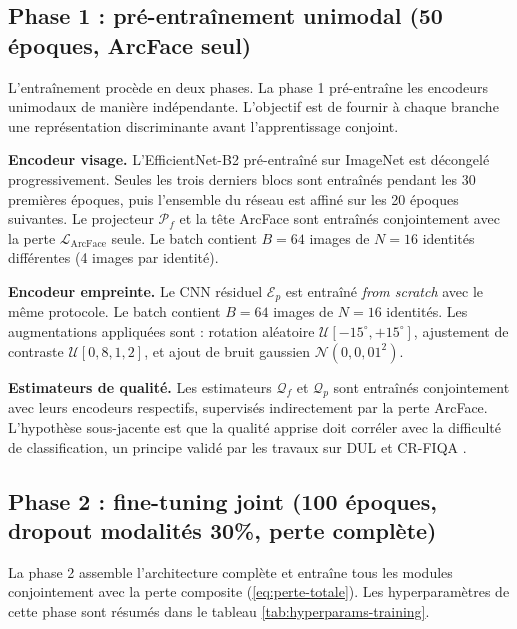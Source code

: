 \documentclass[12pt,a4paper]{report}
\begin{document}
\subsection{Phase 1 : pr\'{e}-entra\^{i}nement unimodal (50 \'{e}poques, ArcFace seul)}

L'entra\^{i}nement proc\`{e}de en deux phases. La phase 1 pr\'{e}-entra\^{i}ne les encodeurs unimodaux de mani\`{e}re ind\'{e}pendante. L'objectif est de fournir \`{a} chaque branche une repr\'{e}sentation discriminante avant l'apprentissage conjoint.

\textbf{Encodeur visage.} L'EfficientNet-B2 pr\'{e}-entra\^{i}n\'{e} sur ImageNet est d\'{e}congel\'{e} progressivement. Seules les trois derniers blocs sont entra\^{i}n\'{e}s pendant les 30 premi\`{e}res \'{e}poques, puis l'ensemble du r\'{e}seau est affin\'{e} sur les 20 \'{e}poques suivantes. Le projecteur $\mathcal{P}_f$ et la t\^{e}te ArcFace sont entra\^{i}n\'{e}s conjointement avec la perte $\mathcal{L}_{\text{ArcFace}}$ seule. Le batch contient $B = 64$ images de $N = 16$ identit\'{e}s diff\'{e}rentes (4 images par identit\'{e}).

\textbf{Encodeur empreinte.} Le CNN r\'{e}siduel $\mathcal{E}_p$ est entra\^{i}n\'{e} \textit{from scratch} avec le m\^{e}me protocole. Le batch contient $B = 64$ images de $N = 16$ identit\'{e}s. Les augmentations appliqu\'{e}es sont : rotation al\'{e}atoire $\mathcal{U}[-15^{\circ}, +15^{\circ}]$, ajustement de contraste $\mathcal{U}[0{,}8, 1{,}2]$, et ajout de bruit gaussien $\mathcal{N}(0, 0{,}01^2)$.

\textbf{Estimateurs de qualit\'{e}.} Les estimateurs $\mathcal{Q}_f$ et $\mathcal{Q}_p$ sont entra\^{i}n\'{e}s conjointement avec leurs encodeurs respectifs, supervis\'{e}s indirectement par la perte ArcFace. L'hypoth\`{e}se sous-jacente est que la qualit\'{e} apprise doit corr\'{e}ler avec la difficult\'{e} de classification, un principe valid\'{e} par les travaux sur DUL \cite{chang2020data} et CR-FIQA \cite{boutros2023crfiqa}.

\subsection{Phase 2 : fine-tuning joint (100 \'{e}poques, dropout modalit\'{e}s 30\%, perte compl\`{e}te)}

La phase 2 assemble l'architecture compl\`{e}te et entra\^{i}ne tous les modules conjointement avec la perte composite (\ref{eq:perte-totale}). Les hyperparam\`{e}tres de cette phase sont r\'{e}sum\'{e}s dans le tableau \ref{tab:hyperparams-training}.
\end{document}
